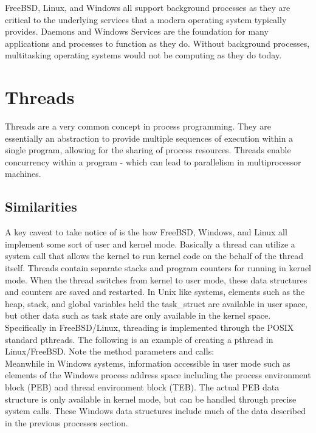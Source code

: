 \documentclass[letterpaper,10pt,titlepage]{article}
\begin{document}
FreeBSD, Linux, and Windows all support background processes as they are critical to the underlying services that a modern operating system typically provides.  Daemons and Windows Services are the foundation for many applications and processes to function as they do.  Without background processes, multitasking operating systems would not be computing as they do today.\\

\section{Threads}

Threads are a very common concept in process programming.  They are essentially an abstraction to provide multiple sequences of execution within a single program, allowing for the sharing of process resources.  Threads enable concurrency within a program - which can lead to parallelism in multiprocessor machines.

\subsection{Similarities}

A key caveat to take notice of is the how FreeBSD, Windows, and Linux all implement some sort of user and kernel mode.  Basically a thread can utilize a system call that allows the kernel to run kernel code on the behalf of the thread itself.  Threads contain separate stacks and program counters for running in kernel mode.  When the thread switches from kernel to user mode, these data structures and counters are saved and restarted.  In Unix like systems, elements such as the heap, stack, and global variables held the task\_struct are available in user space, but other data such as task state are only available in the kernel space.\cite{lkd4}  Specifically in FreeBSD/Linux, threading is implemented through the POSIX standard pthreads.  The following is an example of creating a pthread in Linux/FreeBSD.\cite{pthread1}  Note the method parameters and calls:\\



Meanwhile in Windows systems, information accessible in user mode such as elements of the Windows process address space including the process environment block (PEB) and thread environment block (TEB).  The actual PEB data structure is only available in kernel mode, but can be handled through precise system calls.  These Windows data structures include much of the data described in the previous processes section.\\
\end{document}
